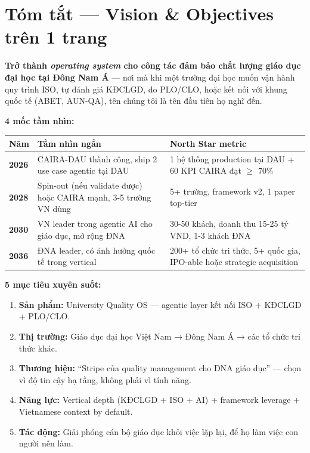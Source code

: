 \documentclass[11pt,a4paper]{article}
\begin{document}
\tableofcontents
\clearpage

\section*{Tóm tắt --- Vision \& Objectives trên 1 trang}

\begin{visionbox}[title=Tầm nhìn 10 năm (2036)]
\textbf{Trở thành \textit{operating system} cho công tác đảm bảo chất lượng giáo dục
đại học tại Đông Nam Á} --- nơi mà khi một trường đại học muốn vận hành quy
trình ISO, tự đánh giá KĐCLGD, đo PLO/CLO, hoặc kết nối với khung quốc tế
(ABET, AUN-QA), tên chúng tôi là tên đầu tiên họ nghĩ đến.
\end{visionbox}

\textbf{4 mốc tầm nhìn:}

\begin{tabularx}{\linewidth}{@{}p{1.3cm} X X@{}}
\toprule
\textbf{Năm} & \textbf{Tầm nhìn ngắn} & \textbf{North Star metric} \\
\midrule
\textbf{2026} & CAIRA-DAU thành công, ship 2 use case agentic tại DAU & 1 hệ thống production tại DAU + 60 KPI CAIRA đạt $\geq$ 70\% \\
\textbf{2028} & Spin-out (nếu validate được) hoặc CAIRA mạnh, 3-5 trường VN dùng & 5+ trường, framework v2, 1 paper top-tier \\
\textbf{2030} & VN leader trong agentic AI cho giáo dục, mở rộng ĐNA & 30-50 khách, doanh thu 15-25 tỷ VND, 1-3 khách ĐNA \\
\textbf{2036} & ĐNA leader, có ảnh hưởng quốc tế trong vertical & 200+ tổ chức tri thức, 5+ quốc gia, IPO-able hoặc strategic acquisition \\
\bottomrule
\end{tabularx}

\textbf{5 mục tiêu xuyên suốt:}

\begin{enumerate}
\item \textbf{Sản phẩm:} University Quality OS — agentic layer kết nối ISO + KĐCLGD + PLO/CLO.
\item \textbf{Thị trường:} Giáo dục đại học Việt Nam → Đông Nam Á → các tổ chức tri thức khác.
\item \textbf{Thương hiệu:} ``Stripe của quality management cho ĐNA giáo dục'' --- chọn vì độ tin cậy hạ tầng, không phải vì tính năng.
\item \textbf{Năng lực:} Vertical depth (KĐCLGD + ISO + AI) + framework leverage + Vietnamese context by default.
\item \textbf{Tác động:} Giải phóng cán bộ giáo dục khỏi việc lặp lại, để họ làm việc con người nên làm.
\end{enumerate}
\end{document}
